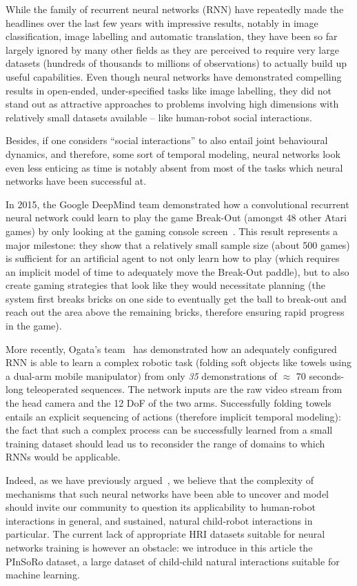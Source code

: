 \documentclass{article}
\begin{document}
While the family of recurrent neural networks (RNN) have repeatedly made the
headlines over the last few years with impressive results, notably in image
classification, image labelling and automatic translation, they have been so far 
largely ignored by  many other fields as they are perceived to require very
large datasets (hundreds of thousands to millions of observations) to actually
build up useful capabilities. Even though neural networks have demonstrated
compelling results in open-ended, under-specified tasks like image labelling, they
did not stand out as attractive approaches to problems involving high dimensions
with relatively small datasets available -- like human-robot social
interactions.

Besides, if one considers ``social interactions'' to also entail joint
behavioural dynamics, and therefore, some sort of temporal modeling, neural
networks look even less enticing as time is notably absent from most of the
tasks which neural networks have been successful at.

In 2015, the Google DeepMind team demonstrated how a convolutional
recurrent neural network could learn to play the game Break-Out (amongst
48 other Atari games) by only looking at the gaming console
screen~\cite{mnih2015human}. This result represents a major milestone: they show
that a relatively small sample size (about 500 games) is sufficient for an 
artificial agent to not only learn how to play (which requires an implicit model 
of time to adequately move the Break-Out paddle), but to also create gaming 
strategies that look like they would necessitate planning (the system first
breaks bricks on one side to eventually get the ball to break-out and reach out the area
above the remaining bricks, therefore ensuring rapid progress in the
game).

More recently, Ogata's team~\cite{yang2017repeatable} has demonstrated how an
adequately configured RNN is able to learn a complex robotic task (folding soft
objects like towels using a dual-arm mobile manipulator) from only \emph{35}
demonstrations of $\approx$ 70 seconds-long teleoperated
sequences. The network inputs are the raw video stream from the head camera and the
12 DoF of the two arms. Successfully folding towels entails an explicit sequencing of
actions (therefore implicit temporal modeling): the fact that such a complex
process can be successfully learned from a small training dataset should lead
us to reconsider the range of domains to which RNNs would be applicable.

Indeed, as we have previously argued~\cite{lemaignan2016towards}, we believe
that the complexity of mechanisms that such neural networks have been able to
uncover and model should invite our community to question its applicability to
human-robot interactions in general, and sustained, natural child-robot
interactions in particular. The current lack of appropriate HRI
datasets suitable for neural networks training is however an obstacle: we
introduce in this article the PInSoRo dataset, a large dataset of child-child
natural interactions suitable for machine learning.
\end{document}
